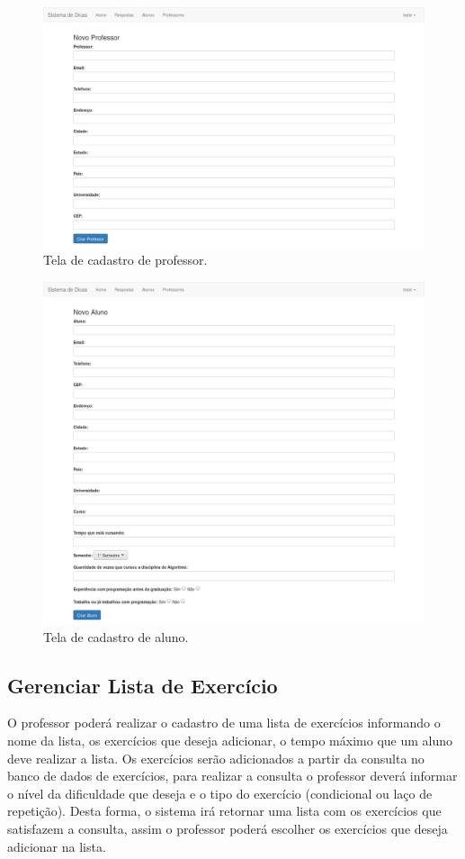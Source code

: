 \begin{figure}[ht]
	\centering
	\captionsetup{justification=centering}
	\includegraphics[width=.8\linewidth]{imagens/cadastroprofessor.png}
	\caption{Tela de cadastro de professor.}
	\label{figura:cadastroprofessor}
\end{figure}

\begin{figure}[ht]		
	\centering
	\captionsetup{justification=centering}
	\includegraphics[width=.8\linewidth]{imagens/cadastroaluno.png}
	\caption{Tela de cadastro de aluno.}
	\label{figura:cadastroaluno}
\end{figure}

\frontmatter

\subsection{Gerenciar Lista de Exercício}

O professor poderá realizar o cadastro de uma lista de exercícios informando o nome da lista, os exercícios que deseja adicionar, o tempo máximo que um aluno deve realizar a lista. Os exercícios serão adicionados a partir da consulta no banco de dados de exercícios, para realizar a consulta o professor deverá informar o nível da dificuldade que deseja e o tipo do exercício (condicional ou laço de repetição). Desta forma, o sistema irá retornar uma lista com os exercícios que satisfazem a consulta, assim o professor poderá escolher os exercícios que deseja adicionar na lista.

